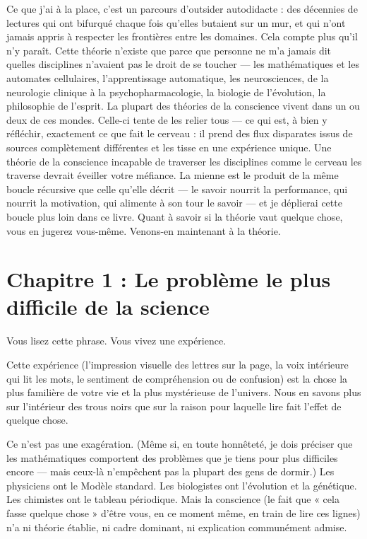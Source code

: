 \documentclass[11pt, twoside, openright]{book}
\begin{document}
Ce que j'ai à la place, c'est un parcours d'outsider autodidacte : des décennies de lectures qui ont bifurqué chaque fois qu'elles butaient sur un mur, et qui n'ont jamais appris à respecter les frontières entre les domaines. Cela compte plus qu'il n'y paraît. Cette théorie n'existe que parce que personne ne m'a jamais dit quelles disciplines n'avaient pas le droit de se toucher --- les mathématiques et les automates cellulaires, l'apprentissage automatique, les neurosciences, de la neurologie clinique à la psychopharmacologie, la biologie de l'évolution, la philosophie de l'esprit. La plupart des théories de la conscience vivent dans un ou deux de ces mondes. Celle-ci tente de les relier tous --- ce qui est, à bien y réfléchir, exactement ce que fait le cerveau : il prend des flux disparates issus de sources complètement différentes et les tisse en une expérience unique. Une théorie de la conscience incapable de traverser les disciplines comme le cerveau les traverse devrait éveiller votre méfiance. La mienne est le produit de la même boucle récursive que celle qu'elle décrit --- le savoir nourrit la performance, qui nourrit la motivation, qui alimente à son tour le savoir --- et je déplierai cette boucle plus loin dans ce livre. Quant à savoir si la théorie vaut quelque chose, vous en jugerez vous-même. Venons-en maintenant à la théorie.


\mainmatter
\pagestyle{fancy}
\chapter*{Chapitre 1 : Le problème le plus difficile de la science}

Vous lisez cette phrase. Vous vivez une expérience.

Cette expérience (l'impression visuelle des lettres sur la page, la voix intérieure qui lit les mots, le sentiment de compréhension ou de confusion) est la chose la plus familière de votre vie et la plus mystérieuse de l'univers. Nous en savons plus sur l'intérieur des trous noirs que sur la raison pour laquelle lire fait l'effet de quelque chose.

Ce n'est pas une exagération. (Même si, en toute honnêteté, je dois préciser que les mathématiques comportent des problèmes que je tiens pour plus difficiles encore --- mais ceux-là n'empêchent pas la plupart des gens de dormir.) Les physiciens ont le Modèle standard. Les biologistes ont l'évolution et la génétique. Les chimistes ont le tableau périodique. Mais la conscience (le fait que « cela fasse quelque chose » d'être vous, en ce moment même, en train de lire ces lignes) n'a ni théorie établie, ni cadre dominant, ni explication communément admise.
\end{document}
